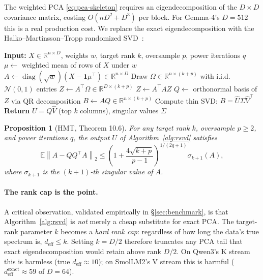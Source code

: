 \documentclass[11pt,a4paper]{article}
\theoremstyle{definition}
\theoremstyle{plain}
\newtheorem{proposition}[theorem]{Proposition}
\newcommand{\R}{\mathbb{R}}
\newcommand{\E}{\mathbb{E}}
\newcommand{\norm}[1]{\left\lVert#1\right\rVert}
\DeclareMathOperator{\diag}{diag}
\begin{document}
The weighted PCA \eqref{eq:pca-skeleton} requires an eigendecomposition of the $D \times D$ covariance matrix, costing $O(nD^2 + D^3)$ per block. For Gemma-4's $D = 512$ this is a real production cost. We replace the exact eigendecomposition with the Halko--Martinsson--Tropp randomized SVD~\cite{halko-martinsson-tropp}:

\begin{algorithm}[H]
\caption{Weighted randomized SVD (Algorithm~4.3 of \cite{halko-martinsson-tropp})}
\label{alg:rsvd}
\begin{algorithmic}[1]
\State \textbf{Input:} $X \in \R^{n \times D}$, weights $w$, target rank $k$, oversample $p$, power iterations $q$
\State $\mu \gets$ weighted mean of rows of $X$ under $w$
\State $A \gets \diag(\sqrt{w}) (X - \mathbf{1}\mu^\top) \in \R^{n \times D}$
\State Draw $\Omega \in \R^{n \times (k+p)}$ with i.i.d.\ $\mathcal{N}(0, 1)$ entries
\State $Z \gets A^\top \Omega \in \R^{D \times (k+p)}$
  \State $Z \gets A^\top A Z$ 
\EndFor
\State $Q \gets$ orthonormal basis of $Z$ via QR decomposition
\State $B \gets A Q \in \R^{n \times (k+p)}$
\State Compute thin SVD: $B = \hat U \Sigma \hat V^\top$
\State \textbf{Return} $U = Q \hat V$ (top $k$ columns), singular values $\Sigma$
\end{algorithmic}
\end{algorithm}

\begin{proposition}[HMT, Theorem 10.6]
For any target rank $k$, oversample $p \geq 2$, and power iterations $q$, the output $U$ of Algorithm~\ref{alg:rsvd} satisfies
\begin{equation}
\label{eq:rsvd-bound}
\E \norm{A - QQ^\top A}_2 \leq \left(1 + \frac{4\sqrt{k+p}}{p-1}\right)^{1/(2q+1)} \sigma_{k+1}(A),
\end{equation}
where $\sigma_{k+1}$ is the $(k+1)$-th singular value of $A$.
\end{proposition}

\paragraph{The rank cap is the point.}
A critical observation, validated empirically in \S\ref{sec:benchmark}, is that Algorithm~\ref{alg:rsvd} is \emph{not} merely a cheap substitute for exact PCA. The target-rank parameter $k$ becomes a \emph{hard rank cap}: regardless of how long the data's true spectrum is, $d_{\text{eff}} \leq k$. Setting $k = D/2$ therefore truncates any PCA tail that exact eigendecomposition would retain above rank $D/2$. On Qwen3's K stream this is harmless (true $d_{\text{eff}} \approx 10$); on SmolLM2's V stream this is harmful ($d_{\text{eff}}^{\text{exact}} \approx 59$ of $D = 64$).
\end{document}
